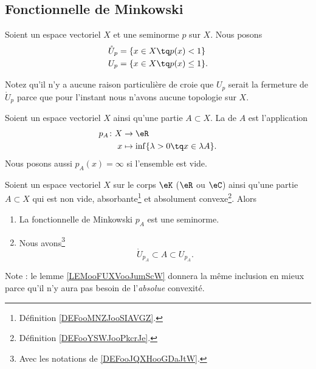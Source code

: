 \subsection{Fonctionnelle de Minkowski}

\begin{definition}		\label{DEFooJQXHooGDaJtW}
	Soient un espace vectoriel \( X\) et une seminorme \( p\) sur \( X\). Nous posons
	\begin{subequations}
		\begin{align}
			\mathring{U}_p & =\{ x\in X\tq p(x)<1 \}      \\
			U_p            & =\{ x\in X\tq p(x)\leq 1 \}.
		\end{align}
	\end{subequations}
\end{definition}

Notez qu'il n'y a aucune raison particulière de croie que \( U_p\) serait la fermeture de \( \mathring{U}_p\) parce que pour l'instant nous n'avons aucune topologie sur \( X\).

\begin{definition}		\label{DEFooYQYBooRkAfjG}
	Soient un espace vectoriel \( X\) ainsi qu'une partie \( A\subset X\). La  de \( A\) est l'application
	\begin{equation}
		\begin{aligned}
			p_A\colon X & \to \eR                                         \\
			x           & \mapsto \inf\{ \lambda >0\tq x\in \lambda A \}.
		\end{aligned}
	\end{equation}
	Nous posons aussi \( p_A(x)=\infty\) si l'ensemble est vide.
\end{definition}

\begin{lemma}		\label{LEMooEIWEooPgoskd}
	Soient un espace vectoriel \( X\) sur le corps \( \eK\) (\( \eR\) ou \( \eC\)) ainsi qu'une partie \( A\subset X\) qui est non vide, absorbante\footnote{Définition \ref{DEFooMNZJooSIAVGZ}.} et absolument convexe\footnote{Définition \ref{DEFooYSWJooPkcrJe}.}. Alors
	\begin{enumerate}
		\item
		      La fonctionnelle de Minkowski \( p_A\) est une seminorme.
		\item
		      Nous avons\footnote{Avec les notations de \ref{DEFooJQXHooGDaJtW}.}
		      \begin{equation}
			      \mathring{U}_{p_A}\subset A\subset U_{p_A}.
		      \end{equation}
	\end{enumerate}
	Note : le lemme \ref{LEMooFUXVooJumScW} donnera la même inclusion en mieux parce qu'il n'y aura pas besoin de l'\emph{absolue} convexité.
\end{lemma}

